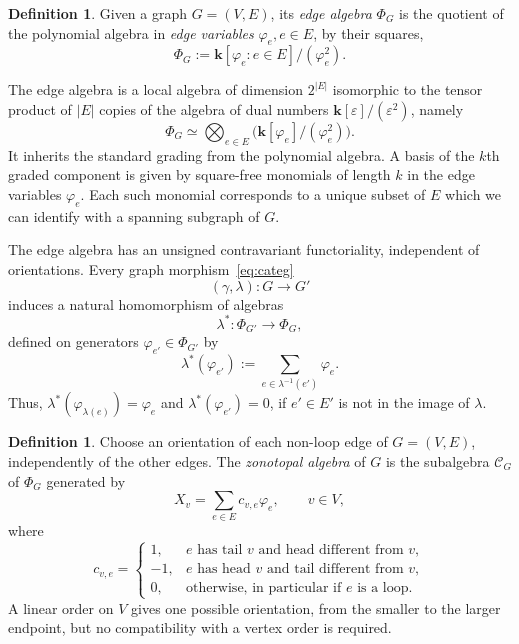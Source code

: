 \documentclass[reqno]{article}
\theoremstyle{plain} %
\theoremstyle{definition}
\newtheorem{definition}[theorem]{Definition}
\theoremstyle{remark}
\newcommand{\K} {\mathbf{k}}
\newcommand {\CC}{\mathscr{C}}
\newcommand{\ve}{\varepsilon }
\numberwithin{equation}{section}
\begin{document}
\begin{definition}
 Given a graph $G=(V,E)$, its \emph{edge algebra} $\Phi_G$ is the
 quotient of the polynomial algebra in \emph{edge variables}
 $\varphi_e, e\in E$, by their squares,
    \begin{equation}
    \label{eq:sq-free}
    \Phi_G:= \K[\varphi_e : e\in E]/(\varphi_e^2).
  \end{equation}
\end{definition}
The edge algebra is a local algebra of dimension $2^{|E|}$ isomorphic to the tensor product of $|E|$ copies of the algebra of dual numbers
$\K[\ve]/(\ve^2)$, namely
 \[
\Phi_G\simeq\bigotimes_{e\in E} \big(\K[\varphi_e]/(\varphi_e^2)\big).
 \]
%
It inherits the standard grading from the polynomial algebra. A basis of the $k$th graded component is given by square-free monomials of length $k$ in the edge variables $\varphi_e$. Each such monomial corresponds to a unique subset of $E$ which we can identify with a spanning subgraph of $G$.

The edge algebra has an unsigned contravariant functoriality,
independent of orientations. Every graph morphism~\eqref{eq:categ}
 \[
(\gamma,\lambda)\colon G\to G'
 \]
induces a natural homomorphism of algebras
 \[
\lambda^*\colon \Phi_{G'}\to \Phi_{G},
 \]
defined on generators
$\varphi_{e'}\in \Phi_{G'}$ by
\begin{equation}
  \label{eq:functor}
\lambda^*(\varphi_{e'}):=\sum_{e\in \lambda^{-1}(e')}\varphi_e.
\end{equation}
Thus, $\lambda^*(\varphi_{\lambda(e)})=\varphi_e$ and
$\lambda^*(\varphi_{e'})= 0$, if $e'\in E'$ is not in the image of $\lambda$.

\begin{definition}
Choose an orientation of each non-loop edge of $G=(V,E)$, independently
of the other edges. The \emph{zonotopal algebra} of $G$ is the subalgebra
$\CC_G$ of $\Phi_G$ generated by
\begin{equation}\label{eq:gens}
X_v=\sum_{e\in E}c_{v,e}\varphi_e,\qquad v\in V,
\end{equation}
where
\begin{equation}\label{eq:def}
c_{v,e}=\begin{cases}
 1,&e\text{ has tail }v\text{ and head different from }v,\\
 -1,&e\text{ has head }v\text{ and tail different from }v,\\
 0,&\text{otherwise, in particular if }e\text{ is a loop}.
\end{cases}
\end{equation}
A linear order on $V$ gives one possible orientation, from the smaller
to the larger endpoint, but no compatibility with a vertex order is
required.
\end{definition}
\end{document}
